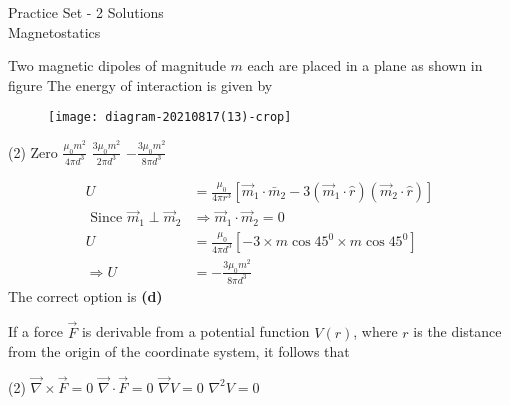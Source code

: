 \newpage
\begin{abox}
	Practice Set - 2 Solutions\\\vspace{0.2cm}
	Magnetostatics
	\end{abox}
\begin{enumerate}
	\begin{minipage}{\textwidth}
		\item Two magnetic dipoles of magnitude $m$ each are placed in a plane as shown in figure The energy of interaction is given by
		\begin{figure}[H]
			\centering
			\texttt{[image: diagram-20210817(13)-crop]}
			\caption{}
			\label{}
		\end{figure}
	\end{minipage}
	\begin{tasks}(2)
		\task[\textbf{A.}] Zero
		\task[\textbf{B.}]$\frac{\mu_{0} m^{2}}{4 \pi d^{3}}$
		\task[\textbf{C.}]$\frac{3 \mu_{0} m^{2}}{2 \pi d^{3}}$
		\task[\textbf{D.}]$-\frac{3 \mu_{0} m^{2}}{8 \pi d^{3}}$
	\end{tasks}
	\begin{answer}
		\begin{align*}
		U&=\frac{\mu_{0}}{4 \pi r^{3}}\left[\vec{m}_{1} \cdot \bar{m}_{2}-3\left(\vec{m}_{1} \cdot \hat{r}\right)\left(\vec{m}_{2} \cdot \hat{r}\right)\right] \\
		\text { Since } \vec{m}_{1} \perp \vec{m}_{2} &\Rightarrow \vec{m}_{1} \cdot \vec{m}_{2}=0\\
		 U&=\frac{\mu_{0}}{4 \pi d^{3}}\left[-3 \times m \cos 45^{0} \times m \cos 45^{0}\right] \\
		\Rightarrow U&=-\frac{3 \mu_{0} m^{2}}{8 \pi d^{3}}
		\end{align*}	
		The correct option is \textbf{(d)}
	\end{answer}
	\begin{minipage}{\textwidth}
		\item If a force $\vec{F}$ is derivable from a potential function $V(r)$, where $r$ is the distance from the origin of the coordinate system, it follows that
	\end{minipage}
	\begin{tasks}(2)
		\task[\textbf{A.}]$\vec{\nabla} \times \vec{F}=0$
		\task[\textbf{B.}]$\vec{\nabla} \cdot \vec{F}=0$
		\task[\textbf{C.}]$\vec{\nabla} V=0$
		\task[\textbf{D.}]$\nabla^{2} V=0$
	\end{tasks}
	\begin{answer}

\end{answer}
\end{enumerate}
